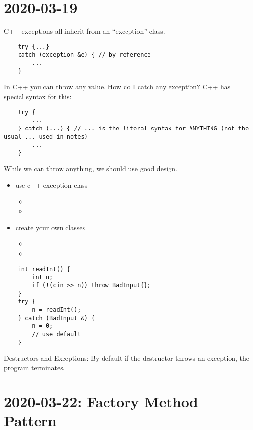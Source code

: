 \section{2020-03-19}
C++ exceptions all inherit from an ``exception'' class.
\begin{lstlisting}
    try {...}
    catch (exception &e) { // by reference
        ...
    }
\end{lstlisting}
In C++ you can throw any value. How do I catch any exception? C++ has special syntax for this:
\begin{lstlisting}
    try {
        ...
    } catch (...) { // ... is the literal syntax for ANYTHING (not the usual ... used in notes)
        ...
    }
\end{lstlisting}
While we can throw anything, we should use good design.
\begin{itemize}
    \item use c++ exception class
          \begin{itemize}
              \item {}
              \item {}
          \end{itemize}
    \item create your own classes
          \begin{itemize}
              \item {}
              \item {}
          \end{itemize}
\end{itemize}
\begin{lstlisting}
    int readInt() {
        int n;
        if (!(cin >> n)) throw BadInput{};
    }
    try {
        n = readInt();
    } catch (BadInput &) {
        n = 0;
        // use default
    }
\end{lstlisting}
Destructors and Exceptions: By default if the destructor throws an exception, the program
terminates.
\section{2020-03-22: Factory Method Pattern}
